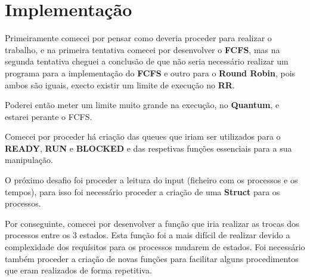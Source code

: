 \documentclass[11pt]{article}   %
\begin{document}
\section{Implementação}

\hspace{0,5cm}Primeiramente comecei por pensar como deveria proceder para realizar o trabalho, e na primeira tentativa comecei por desenvolver o \textbf{FCFS}, mas na segunda tentativa cheguei a conclusão de que não seria necessário realizar um programa para a implementação do \textbf{FCFS} e outro para o \textbf{Round Robin}, pois ambos são iguais, execto existir um limite de execução no \textbf{RR}. \par
Poderei então meter um limite muito grande na execução, no \textbf{Quantum}, e estarei perante o FCFS. \par
Comecei por proceder há criação das queues que iriam ser utilizados para o \textbf{READY}, \textbf{RUN} e \textbf{BLOCKED} e das respetivas funções essenciais para a sua manipulação. \par
O próximo desafio foi proceder a leitura do input (ficheiro com os processos e os tempos), para isso foi necessário proceder a criação de uma \textbf{Struct} para os processos.\par
Por conseguinte, comecei por desenvolver a função que iria realizar as trocas dos processos entre os 3 estados. Esta função foi a mais difícil de realizar devido a complexidade dos requísitos para os processos mudarem de estados. Foi necessário também proceder a criação de novas funções para facilitar alguns procedimentos que eram realizados de forma repetitiva.

\end{document}
